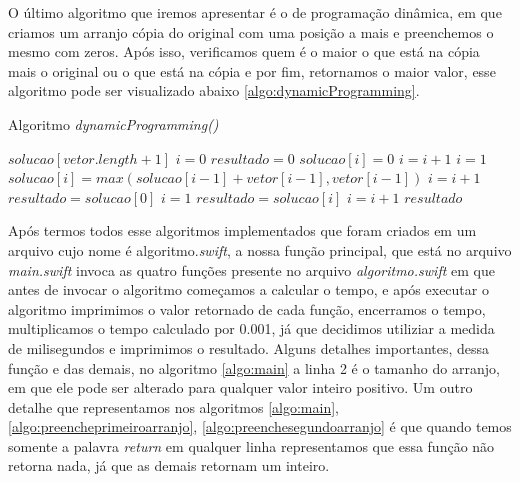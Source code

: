 \documentclass[
	12pt,				%
	oneside,   	        %
	a4paper,			%
	english,			%
	french,				%
	spanish,			%
	brazil,				%
	]{pacotes/abntex2}
\begin{document}
O último algoritmo que iremos apresentar é o de programação dinâmica, em que  criamos um arranjo cópia do original com uma posição a mais e preenchemos o mesmo com zeros. Após isso, verificamos quem é o maior o que está na cópia mais o original ou o que está na cópia e por fim, retornamos o maior valor, esse algoritmo pode ser visualizado abaixo \ref{algo:dynamicProgramming}.

\begin{algorithm}[!htb]
\caption{Algoritmo \textit{dynamicProgramming()}}
\label{algo:dynamicProgramming}
\begin{algorithmic}[1]
        \State  $solucao[vetor.length + 1]$
        \State  $i = 0$
        \State  $resultado = 0$
            \State $solucao[i] = 0$
            \State $i = i + 1$
        \EndWhile
        \State  $i = 1$
            \State $solucao[i] = max(solucao[i-1]+vetor[i-1], vetor[i-1])$
            \State $i = i + 1$
        \EndWhile
        \State  $resultado = solucao[0]$
        \State  $i = 1$
                \State $resultado = solucao[i]$
            \EndIf
            \State $i = i + 1$
        \EndWhile
        \State \Return $resultado$
    \EndFunction
\end{algorithmic}
\end{algorithm}

Após termos todos esse algoritmos implementados que foram criados em um arquivo cujo nome é algoritmo.\textit{swift}, a nossa função principal, que está no arquivo \textit{main.swift} invoca as quatro funções presente no arquivo \textit{algoritmo.swift} em que antes de invocar o algoritmo começamos a calcular o tempo, e após executar o algoritmo imprimimos o valor retornado de cada função, encerramos o tempo, multiplicamos o tempo calculado por 0.001, já que decidimos utiliziar a medida de milisegundos e imprimimos o resultado. Alguns detalhes importantes, dessa função e das demais, no algoritmo \ref{algo:main} a linha 2 é o tamanho do arranjo, em que ele pode ser alterado para qualquer valor inteiro positivo. Um outro detalhe que representamos nos algoritmos \ref{algo:main}, \ref{algo:preencheprimeiroarranjo}, \ref{algo:preenchesegundoarranjo} é que quando temos somente a palavra \textit{return} em qualquer linha representamos que essa função não retorna nada, já que as demais retornam um inteiro.
\end{document}
